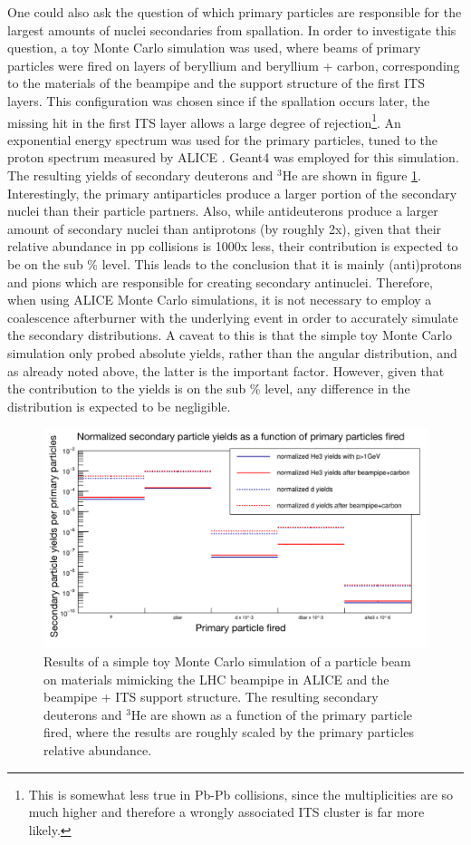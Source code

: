 One could also ask the question of which primary particles are responsible for the largest amounts of nuclei secondaries from spallation. In order to investigate this question, a toy Monte Carlo simulation was used, where beams of primary particles were fired on layers of beryllium and beryllium + carbon, corresponding to the materials of the beampipe and the support structure of the first ITS layers. This configuration was chosen since if the spallation occurs later, the missing hit in the first ITS layer allows a large degree of rejection\footnote{This is somewhat less true in Pb-Pb collisions, since the multiplicities are so much higher and therefore a wrongly associated ITS cluster is far more likely.}. An exponential energy spectrum was used for the primary particles, tuned to the proton spectrum measured by ALICE \cite{}. Geant4 was employed for this simulation. The resulting yields of secondary deuterons and $^3\mathrm{He}$ are shown in figure \ref{fig:toyMCGeant4Spallation}. Interestingly, the primary antiparticles produce a larger portion of the secondary nuclei than their particle partners. Also, while antideuterons produce a larger amount of secondary nuclei than antiprotons (by roughly 2x), given that their relative abundance in pp collisions is 1000x less, their contribution is expected to be on the sub \% level. This leads to the conclusion that it is mainly (anti)protons and pions which are responsible for creating secondary antinuclei. Therefore, when using ALICE Monte Carlo simulations, it is not necessary to employ a coalescence afterburner with the underlying event in order to accurately simulate the secondary distributions. A caveat to this is that the simple toy Monte Carlo simulation only probed absolute yields, rather than the angular distribution, and as already noted above, the latter is the important factor. However, given that the contribution to the yields is on the sub \% level, any difference in the distribution is expected to be negligible. 

\begin{figure}[hbtp]
    \centering
    \includegraphics[width=\textwidth]{figures/simpleMC_secondaries_G4.png}
    \caption{Results of a simple toy Monte Carlo simulation of a particle beam on materials mimicking the LHC beampipe in ALICE and the beampipe + ITS support structure. The resulting secondary deuterons and $^3\mathrm{He}$ are shown as a function of the primary particle fired, where the results are roughly scaled by the primary particles relative abundance.}
    \label{fig:toyMCGeant4Spallation}
\end{figure}
